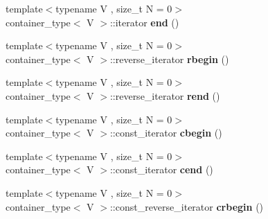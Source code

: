 \begin{DoxyCompactItemize}
\item 
\hypertarget{classheterogeneous_1_1heterovector_3_01_t_00_01_u_00_01_types_8_8_8_4_a1e53f7c9bafa421b0de2638a09acc5c2}{}{\footnotesize template$<$typename V , size\+\_\+t N = 0$>$ }\\container\+\_\+type$<$ V $>$\+::iterator {\bfseries end} ()\label{classheterogeneous_1_1heterovector_3_01_t_00_01_u_00_01_types_8_8_8_4_a1e53f7c9bafa421b0de2638a09acc5c2}

\item 
\hypertarget{classheterogeneous_1_1heterovector_3_01_t_00_01_u_00_01_types_8_8_8_4_a499c049bbc96e3c5d4a04e33707ff6cf}{}{\footnotesize template$<$typename V , size\+\_\+t N = 0$>$ }\\container\+\_\+type$<$ V $>$\+::reverse\+\_\+iterator {\bfseries rbegin} ()\label{classheterogeneous_1_1heterovector_3_01_t_00_01_u_00_01_types_8_8_8_4_a499c049bbc96e3c5d4a04e33707ff6cf}

\item 
\hypertarget{classheterogeneous_1_1heterovector_3_01_t_00_01_u_00_01_types_8_8_8_4_a5c37440bb948cf6a1445f6f73c2fc2b5}{}{\footnotesize template$<$typename V , size\+\_\+t N = 0$>$ }\\container\+\_\+type$<$ V $>$\+::reverse\+\_\+iterator {\bfseries rend} ()\label{classheterogeneous_1_1heterovector_3_01_t_00_01_u_00_01_types_8_8_8_4_a5c37440bb948cf6a1445f6f73c2fc2b5}

\item 
\hypertarget{classheterogeneous_1_1heterovector_3_01_t_00_01_u_00_01_types_8_8_8_4_a1bbab4f90176b28fbe5cc02fc5814a86}{}{\footnotesize template$<$typename V , size\+\_\+t N = 0$>$ }\\container\+\_\+type$<$ V $>$\+::const\+\_\+iterator {\bfseries cbegin} ()\label{classheterogeneous_1_1heterovector_3_01_t_00_01_u_00_01_types_8_8_8_4_a1bbab4f90176b28fbe5cc02fc5814a86}

\item 
\hypertarget{classheterogeneous_1_1heterovector_3_01_t_00_01_u_00_01_types_8_8_8_4_a538eb6bd88836b58bd6a491273e5e6fc}{}{\footnotesize template$<$typename V , size\+\_\+t N = 0$>$ }\\container\+\_\+type$<$ V $>$\+::const\+\_\+iterator {\bfseries cend} ()\label{classheterogeneous_1_1heterovector_3_01_t_00_01_u_00_01_types_8_8_8_4_a538eb6bd88836b58bd6a491273e5e6fc}

\item 
\hypertarget{classheterogeneous_1_1heterovector_3_01_t_00_01_u_00_01_types_8_8_8_4_afe57702f432ad5ccbbcf878d2869382f}{}{\footnotesize template$<$typename V , size\+\_\+t N = 0$>$ }\\container\+\_\+type$<$ V $>$\+::const\+\_\+reverse\+\_\+iterator {\bfseries crbegin} ()\label{classheterogeneous_1_1heterovector_3_01_t_00_01_u_00_01_types_8_8_8_4_afe57702f432ad5ccbbcf878d2869382f}


\end{DoxyCompactItemize}

